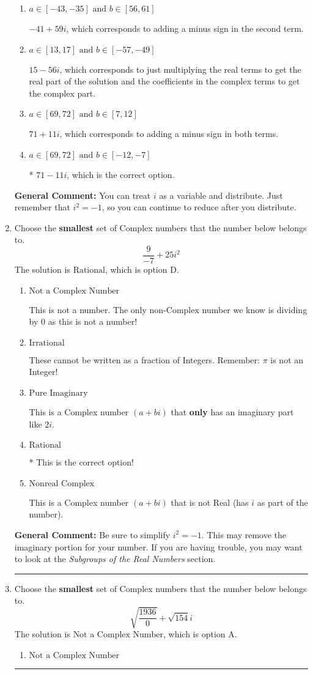 \documentclass{extbook}[14pt]
\newcommand{\litem}[1]{\item #1

\rule{\textwidth}{0.4pt}}
\begin{document}
\begin{enumerate}
{\begin{enumerate}[label=\Alph*.]
 $-41 - 59 i$, which corresponds to adding a minus sign in the first term.
\item \( a \in [-43, -35] \text{ and } b \in [56, 61] \)

 $-41 + 59 i$, which corresponds to adding a minus sign in the second term.
\item \( a \in [13, 17] \text{ and } b \in [-57, -49] \)

 $15 - 56 i$, which corresponds to just multiplying the real terms to get the real part of the solution and the coefficients in the complex terms to get the complex part.
\item \( a \in [69, 72] \text{ and } b \in [7, 12] \)

 $71 + 11 i$, which corresponds to adding a minus sign in both terms.
\item \( a \in [69, 72] \text{ and } b \in [-12, -7] \)

* $71 - 11 i$, which is the correct option.
\end{enumerate}

\textbf{General Comment:} You can treat $i$ as a variable and distribute. Just remember that $i^2=-1$, so you can continue to reduce after you distribute.
}
\litem{
Choose the \textbf{smallest} set of Complex numbers that the number below belongs to.
\[ \frac{9}{-7}+25i^2 \]The solution is \( \text{Rational} \), which is option D.\begin{enumerate}[label=\Alph*.]
\item \( \text{Not a Complex Number} \)

This is not a number. The only non-Complex number we know is dividing by 0 as this is not a number!
\item \( \text{Irrational} \)

These cannot be written as a fraction of Integers. Remember: $\pi$ is not an Integer!
\item \( \text{Pure Imaginary} \)

This is a Complex number $(a+bi)$ that \textbf{only} has an imaginary part like $2i$.
\item \( \text{Rational} \)

* This is the correct option!
\item \( \text{Nonreal Complex} \)

This is a Complex number $(a+bi)$ that is not Real (has $i$ as part of the number).
\end{enumerate}

\textbf{General Comment:} Be sure to simplify $i^2 = -1$. This may remove the imaginary portion for your number. If you are having trouble, you may want to look at the \textit{Subgroups of the Real Numbers} section.
}
\litem{
Choose the \textbf{smallest} set of Complex numbers that the number below belongs to.
\[ \sqrt{\frac{1936}{0}}+\sqrt{154} i \]The solution is \( \text{Not a Complex Number} \), which is option A.\begin{enumerate}[label=\Alph*.]
\item \( \text{Not a Complex Number} \)


\end{enumerate}}
\end{enumerate}
\end{document}
